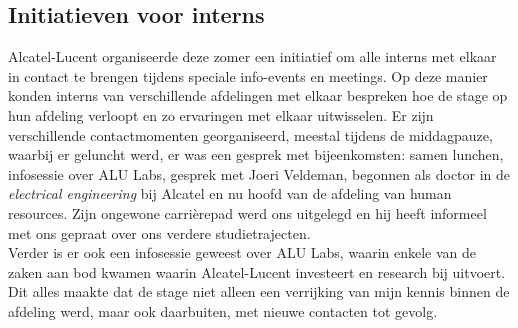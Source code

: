 \documentclass[10pt,a4paper]{article}
\begin{document}
\subsection{Initiatieven voor interns}
Alcatel-Lucent organiseerde deze zomer een initiatief om alle interns met elkaar in contact te brengen tijdens speciale info-events en meetings. Op deze manier konden interns van verschillende afdelingen met elkaar bespreken hoe de stage op hun afdeling verloopt en zo ervaringen met elkaar uitwisselen. Er zijn verschillende contactmomenten georganiseerd, meestal tijdens de middagpauze, waarbij er geluncht werd, er was een gesprek met bijeenkomsten: samen lunchen, infosessie over ALU Labs, gesprek met Joeri Veldeman, begonnen als doctor in de \textit{electrical engineering} bij Alcatel en nu hoofd van de afdeling van human resources. Zijn ongewone carri\`erepad werd ons uitgelegd en hij heeft informeel met ons gepraat over ons verdere studietrajecten.\\
Verder is er ook een infosessie geweest over ALU Labs, waarin enkele van de zaken aan bod kwamen waarin Alcatel-Lucent investeert en research bij uitvoert.\\
Dit alles maakte dat de stage niet alleen een verrijking van mijn kennis binnen de afdeling werd, maar ook daarbuiten, met nieuwe contacten tot gevolg.
\end{document}
